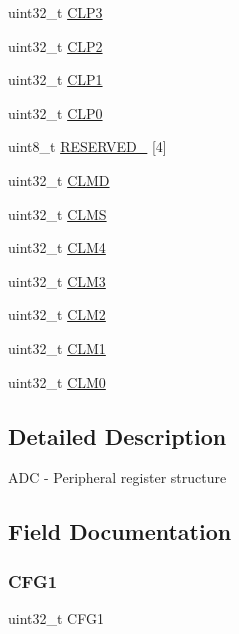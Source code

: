 \begin{DoxyCompactItemize}
\item 
uint32\+\_\+t \hyperlink{struct_a_d_c___mem_map_a3f5dd3a4999f81c45c41be08a3849b98}{C\+L\+P3}
\item 
uint32\+\_\+t \hyperlink{struct_a_d_c___mem_map_a225ce534c9832c8555edd6473b59a41d}{C\+L\+P2}
\item 
uint32\+\_\+t \hyperlink{struct_a_d_c___mem_map_a64450733d1755c38f9466f948ed168c5}{C\+L\+P1}
\item 
uint32\+\_\+t \hyperlink{struct_a_d_c___mem_map_a8297494e7932e271cc59eb5aa896a10e}{C\+L\+P0}
\item 
uint8\+\_\+t \hyperlink{struct_a_d_c___mem_map_a71277aaa40be4473ac2521981f273bd3}{R\+E\+S\+E\+R\+V\+E\+D\+\_} \mbox{[}4\mbox{]}
\item 
uint32\+\_\+t \hyperlink{struct_a_d_c___mem_map_a42f179fbfbc8051ccb50bc11792ef3ee}{C\+L\+MD}
\item 
uint32\+\_\+t \hyperlink{struct_a_d_c___mem_map_aef7c15535415480c4d2ca4d7cc86deab}{C\+L\+MS}
\item 
uint32\+\_\+t \hyperlink{struct_a_d_c___mem_map_aead273022ba55e043f5e0a81d9c5b7c8}{C\+L\+M4}
\item 
uint32\+\_\+t \hyperlink{struct_a_d_c___mem_map_aadc0a60c45854df3d46a33790759ef5f}{C\+L\+M3}
\item 
uint32\+\_\+t \hyperlink{struct_a_d_c___mem_map_a4efbf939e8f39accffa83b16f9607587}{C\+L\+M2}
\item 
uint32\+\_\+t \hyperlink{struct_a_d_c___mem_map_a846cc51f8b255a74920d53c497e690ee}{C\+L\+M1}
\item 
uint32\+\_\+t \hyperlink{struct_a_d_c___mem_map_a511c5f41f61227c49738a729b856bc26}{C\+L\+M0}
\end{DoxyCompactItemize}


\subsection{Detailed Description}
A\+DC -\/ Peripheral register structure 

\subsection{Field Documentation}
\mbox{\label{struct_a_d_c___mem_map_a50355545bc85131128f24459e40f1711}} 
\subsubsection{\texorpdfstring{C\+F\+G1}{CFG1}}
{\footnotesize\ttfamily uint32\+\_\+t C\+F\+G1}

